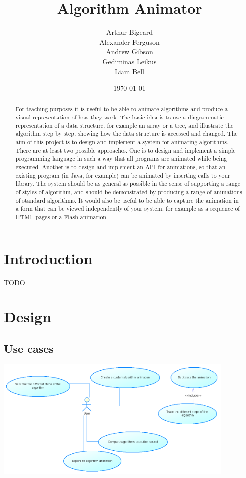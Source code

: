 \documentclass{l3proj}
\begin{document}
\title{Algorithm Animator}
\author{Arthur Bigeard \\
		Alexander Ferguson \\
		Andrew Gibson \\
		Gediminas Leikus \\
		Liam Bell}
\usdate
\date{\today}
\maketitle
\begin{abstract}

For teaching purposes it is useful to be able to animate algorithms and produce a visual representation of how they work. The basic idea is to use a diagrammatic representation of a data structure, for example an array or a tree, and illustrate the algorithm step by step, showing how the data structure is accessed and changed. The aim of this project is to design and implement a system for animating algorithms. There are at least two possible approaches. One is to design and implement a simple programming language in such a way that all programs are animated while being executed. Another is to design and implement an API for animations, so that an existing program (in Java, for example) can be animated by inserting calls to your library. The system should be as general as possible in the sense of supporting a range of styles of algorithm, and should be demonstrated by producing a range of animations of standard algorithms. It would also be useful to be able to 
capture the animation in a form that can be viewed independently of your system, for example as a sequence of HTML pages or a Flash animation.

\end{abstract}
\educationalconsent
\tableofcontents
\chapter{Introduction}
\label{intro}

TODO

\chapter{Design}
\label{design}

\section{Use cases}
\includegraphics[width=115mm]{images/useCases.png}
\end{document}
